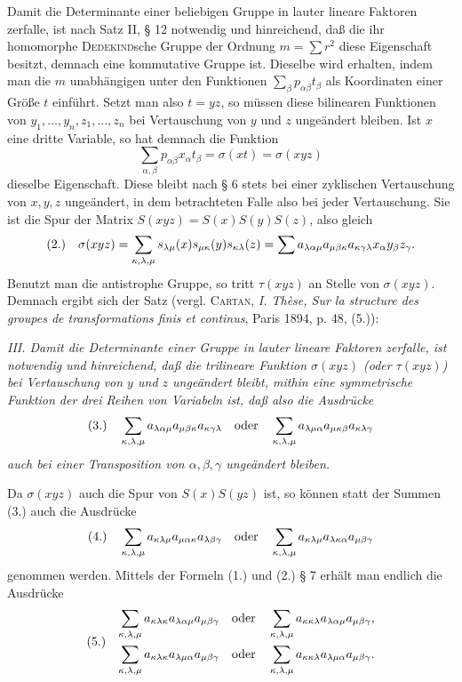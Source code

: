 \documentclass[11pt]{article}
\newcommand{\fnum}[1]{\textup{(\ensuremath{#1}.)}\quad}
\begin{document}
Damit die Determinante einer beliebigen Gruppe in lauter lineare Faktoren zerfalle, ist nach Satz II, § 12 notwendig und hinreichend, daß die ihr homomorphe \textsc{Dedekind}sche Gruppe der Ordnung $m=\sum r^2$ diese Eigenschaft besitzt, demnach eine kommutative Gruppe ist. Dieselbe wird erhalten, indem man die $m$ unabhängigen unter den Funktionen $\sum_\beta p_{\alpha\beta}t_\beta$ als Koordinaten einer Größe $t$ einführt. Setzt man also $t=yz$, so müssen diese bilinearen Funktionen von $y_1,\ldots,y_n,z_1,\ldots,z_n$ bei Vertauschung von $y$ und $z$ ungeändert bleiben. Ist $x$ eine dritte Variable, so hat demnach die Funktion
\[
 \sum_{\alpha,\beta}p_{\alpha\beta}x_\alpha t_\beta=\sigma(xt)=\sigma(xyz)
\]
dieselbe Eigenschaft. Diese bleibt nach § 6 stets bei einer zyklischen Vertauschung von $x,y,z$ ungeändert, in dem betrachteten Falle also bei jeder Vertauschung. Sie ist die Spur der Matrix $S(xyz)=S(x)S(y)S(z)$, also gleich
\[
\fnum{2} \sigma(xyz)=\sum_{\kappa,\lambda,\mu}s_{\lambda\mu}(x)s_{\mu\kappa}(y)s_{\kappa\lambda}(z)
=\sum a_{\lambda\alpha\mu}a_{\mu\beta\kappa}a_{\kappa\gamma\lambda}x_\alpha y_\beta z_\gamma.
\]
Benutzt man die antistrophe Gruppe, so tritt $\tau(xyz)$ an Stelle von $\sigma(xyz)$. Demnach ergibt sich der Satz (vergl. \textsc{Cartan}, \emph{I. Thèse, Sur la structure des groupes de transformations finis et continus}, Paris 1894, p. 48, (5.)):

\emph{III. Damit die Determinante einer Gruppe in lauter lineare Faktoren zerfalle, ist notwendig und hinreichend, daß die trilineare Funktion $\sigma(xyz)$ (oder $\tau(xyz)$) bei Vertauschung von $y$ und $z$ ungeändert bleibt, mithin eine symmetrische Funktion der drei Reihen von Variabeln ist, daß also die Ausdrücke}
\[
\fnum{3} \sum_{\kappa,\lambda,\mu}a_{\lambda\alpha\mu}a_{\mu\beta\kappa}a_{\kappa\gamma\lambda}
\quad\text{oder}\quad
\sum_{\kappa,\lambda,\mu}a_{\lambda\mu\alpha}a_{\mu\kappa\beta}a_{\kappa\lambda\gamma}
\]
\emph{auch bei einer Transposition von $\alpha,\beta,\gamma$ ungeändert bleiben.}

Da $\sigma(xyz)$ auch die Spur von $S(x)S(yz)$ ist, so können statt der Summen (3.) auch die Ausdrücke
\[
\fnum{4} \sum_{\kappa,\lambda,\mu}a_{\kappa\lambda\mu}a_{\mu\alpha\kappa}a_{\lambda\beta\gamma}
\quad\text{oder}\quad
\sum_{\kappa,\lambda,\mu}a_{\kappa\lambda\mu}a_{\lambda\kappa\alpha}a_{\mu\beta\gamma}
\]
genommen werden. Mittels der Formeln (1.) und (2.) § 7 erhält man endlich die Ausdrücke
\[
\fnum{5}\begin{gathered}
 \sum_{\kappa,\lambda,\mu}a_{\kappa\lambda\kappa}a_{\lambda\alpha\mu}a_{\mu\beta\gamma}
 \quad\text{oder}\quad
 \sum_{\kappa,\lambda,\mu}a_{\kappa\kappa\lambda}a_{\lambda\alpha\mu}a_{\mu\beta\gamma},\\
 \sum_{\kappa,\lambda,\mu}a_{\kappa\lambda\kappa}a_{\lambda\mu\alpha}a_{\mu\beta\gamma}
 \quad\text{oder}\quad
 \sum_{\kappa,\lambda,\mu}a_{\kappa\kappa\lambda}a_{\lambda\mu\alpha}a_{\mu\beta\gamma}.
\end{gathered}
\]
\end{document}
